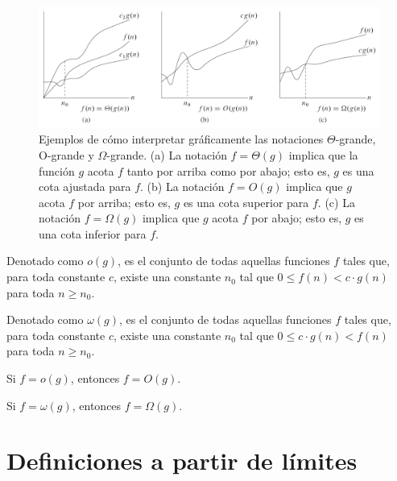 \begin{figure}[H]
\begin{centering}
\includegraphics[width=1\textwidth]{01-algoritmos-secuenciales/figuras/o-grande}
\par\end{centering}
\caption{{\small{}Ejemplos de cómo interpretar gráficamente las notaciones
$\Theta$-grande, O-grande y $\Omega$-grande. (a) La notación $f=\Theta(g)$
implica que la función $g$ acota $f$ tanto por arriba como por abajo;
esto es, $g$ es una cota ajustada para $f$. (b) La notación $f=O(g)$
implica que $g$ acota $f$ por arriba; esto es, $g$ es una cota
superior para $f$. (c) La notación $f=\Omega(g)$ implica que $g$
acota $f$ por abajo; esto es, $g$ es una cota inferior para $f$.}}
\end{figure}

\begin{defn}[o chica]
Denotado como $o(g)$, es el conjunto de todas aquellas funciones
$f$ tales que, para toda constante $c$, existe una constante $n_{0}$
tal que $0\leq f(n)<c\cdot g(n)$ para toda $n\geq n_{0}$.
\end{defn}
%
\begin{defn}
Denotado como $\omega(g)$, es el conjunto de todas aquellas funciones
$f$ tales que, para toda constante $c$, existe una constante $n_{0}$
tal que $0\leq c\cdot g(n)<f(n)$ para toda $n\geq n_{0}$.
\end{defn}
\begin{prop}
Si $f=o(g)$, entonces $f=O(g)$.
\end{prop}
%
\begin{prop}
Si $f=\omega(g)$, entonces $f=\Omega(g)$.
\end{prop}

\section{Definiciones a partir de límites}

